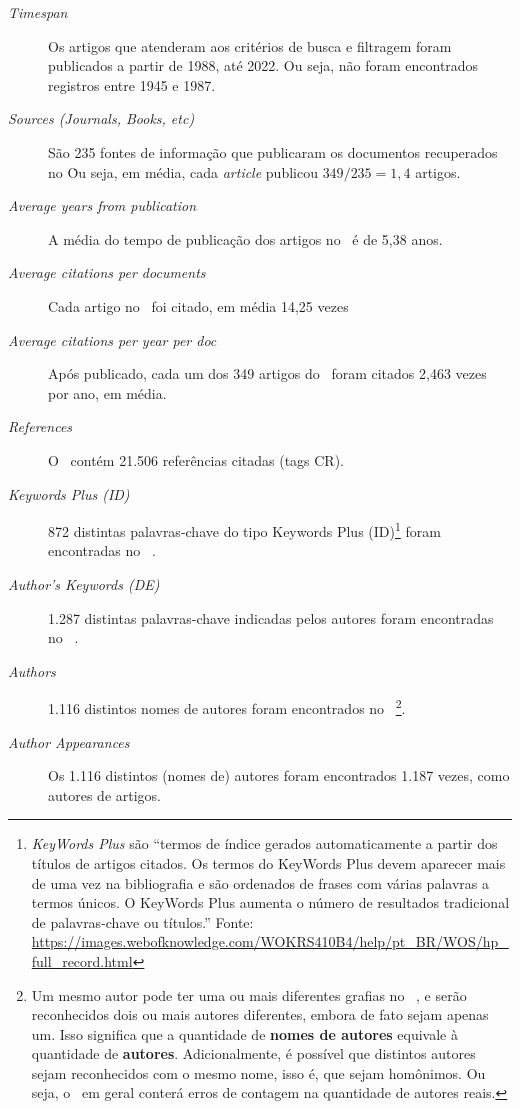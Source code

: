 \begin{description}
    \item [\textit{Timespan}] Os artigos que atenderam aos critérios de busca e filtragem foram publicados a partir de 1988, até 2022. Ou seja, não foram encontrados registros entre 1945 e 1987.
    \item [\textit{Sources (Journals, Books, etc)}] São 235 fontes de informação que publicaram os documentos recuperados no \dataset\. Ou seja, em média, cada \textit{article} publicou $349/235=1,4$ artigos.
    \item [\textit{Average years from publication}] A média do tempo de publicação dos artigos no \dataset\ é de 5,38 anos.
    \item [\textit{Average citations per documents}] Cada artigo no \dataset\ foi citado, em média 14,25 vezes
    \item [\textit{Average citations per year per doc}] Após publicado, cada um dos 349 artigos do \dataset\   foram citados 2,463 vezes por ano, em média.
    \item [\textit{References}] O \dataset\ contém 21.506 referências citadas (tags CR).
    \item [\textit{Keywords Plus (ID)}] 872 distintas palavras-chave do tipo Keywords Plus (ID)\footnote{\textit{KeyWords Plus} são ``termos de índice gerados automaticamente a partir dos títulos de artigos citados. Os termos do KeyWords Plus devem aparecer mais de uma vez na bibliografia e são ordenados de frases com várias palavras a termos únicos. O KeyWords Plus aumenta o número de resultados tradicional de palavras-chave ou títulos.'' Fonte: \url{https://images.webofknowledge.com/WOKRS410B4/help/pt_BR/WOS/hp_full_record.html}} foram encontradas no \dataset\   . 
    \item [\textit{Author's Keywords (DE)}] 1.287 distintas palavras-chave indicadas pelos autores foram encontradas no \dataset\  .
    \item [\textit{Authors}] 1.116 distintos nomes de autores foram encontrados no \dataset\  \footnote{Um mesmo autor pode ter uma ou mais diferentes grafias no \dataset\  , e serão reconhecidos dois ou mais autores diferentes, embora de fato sejam apenas um. Isso significa que a quantidade de \textbf{nomes de autores} equivale à quantidade de \textbf{autores}. Adicionalmente, é possível que distintos autores sejam reconhecidos com o mesmo nome, isso é, que sejam homônimos. Ou seja, o \dataset\   em geral conterá erros de contagem na quantidade de autores reais.}.
    \item [\textit{Author Appearances}] Os 1.116 distintos (nomes de) autores foram encontrados 1.187 vezes, como autores de artigos.

\end{description}
